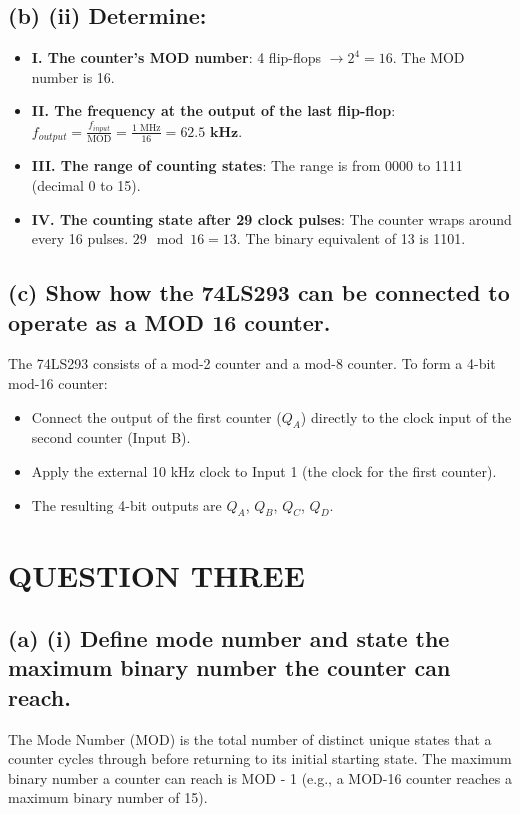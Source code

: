 \documentclass[11pt,a4paper]{article}
\begin{document}
\subsection*{(b) (ii) Determine:}
\begin{itemize}
    \item \textbf{I. The counter's MOD number}: 4 flip-flops $\rightarrow 2^4 = 16$. The MOD number is 16.
    \item \textbf{II. The frequency at the output of the last flip-flop}: 
          $f_{output} = \frac{f_{input}}{\text{MOD}} = \frac{1 \text{ MHz}}{16} = \mathbf{62.5 \text{ kHz}}$.
    \item \textbf{III. The range of counting states}: The range is from 0000 to 1111 (decimal 0 to 15).
    \item \textbf{IV. The counting state after 29 clock pulses}: 
          The counter wraps around every 16 pulses. $29 \mod 16 = 13$. The binary equivalent of 13 is 1101.
\end{itemize}

\subsection*{(c) Show how the 74LS293 can be connected to operate as a MOD 16 counter.}
The 74LS293 consists of a mod-2 counter and a mod-8 counter. To form a 4-bit mod-16 counter:

\begin{itemize}
    \item Connect the output of the first counter ($Q_A$) directly to the clock input of the second counter (Input B).
    \item Apply the external 10 kHz clock to Input 1 (the clock for the first counter).
    \item The resulting 4-bit outputs are $Q_A$, $Q_B$, $Q_C$, $Q_D$.
\end{itemize}

\section*{QUESTION THREE}

\subsection*{(a) (i) Define mode number and state the maximum binary number the counter can reach.}
The Mode Number (MOD) is the total number of distinct unique states that a counter cycles through before returning to its initial starting state. The maximum binary number a counter can reach is MOD - 1 (e.g., a MOD-16 counter reaches a maximum binary number of 15).
\end{document}
